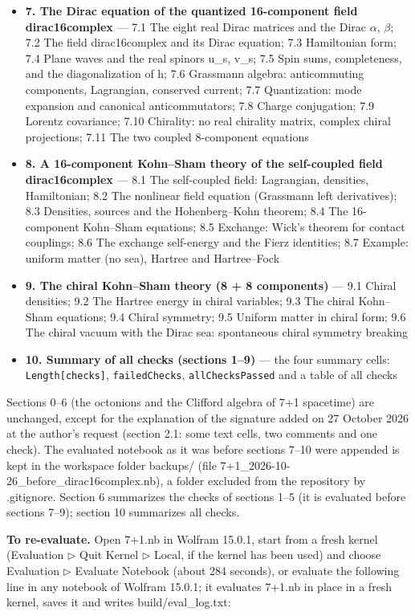 \documentclass[10pt,a4paper]{article}
\begin{document}
\begin{itemize}
\item \textbf{7. The Dirac equation of the quantized 16-component field dirac16complex} — 7.1 The eight real Dirac matrices and the Dirac \texorpdfstring{\ensuremath{\alpha}}{α}, \texorpdfstring{\ensuremath{\beta}}{β}; 7.2 The field dirac16complex and its Dirac equation; 7.3 Hamiltonian form; 7.4 Plane waves and the real spinors u\_s, v\_s; 7.5 Spin sums, completeness, and the diagonalization of h; 7.6 Grassmann algebra: anticommuting components, Lagrangian, conserved current; 7.7 Quantization: mode expansion and canonical anticommutators; 7.8 Charge conjugation; 7.9 Lorentz covariance; 7.10 Chirality: no real chirality matrix, complex chiral projections; 7.11 The two coupled 8-component equations
\item \textbf{8. A 16-component Kohn–Sham theory of the self-coupled field dirac16complex} — 8.1 The self-coupled field: Lagrangian, densities, Hamiltonian; 8.2 The nonlinear field equation (Grassmann left derivatives); 8.3 Densities, sources and the Hohenberg–Kohn theorem; 8.4 The 16-component Kohn–Sham equations; 8.5 Exchange: Wick’s theorem for contact couplings; 8.6 The exchange self-energy and the Fierz identities; 8.7 Example: uniform matter (no sea), Hartree and Hartree–Fock
\item \textbf{9. The chiral Kohn–Sham theory (8 + 8 components)} — 9.1 Chiral densities; 9.2 The Hartree energy in chiral variables; 9.3 The chiral Kohn–Sham equations; 9.4 Chiral symmetry; 9.5 Uniform matter in chiral form; 9.6 The chiral vacuum with the Dirac sea: spontaneous chiral symmetry breaking
\item \textbf{10. Summary of all checks (sections 1–9)} — the four summary cells: \texttt{Length[checks]}, \texttt{failedChecks}, \texttt{allChecksPassed} and a table of all checks
\end{itemize}
Sections 0–6 (the octonions and the Clifford algebra of 7+1 spacetime) are unchanged, except for the explanation of the signature added on 27 October 2026 at the author’s request (section 2.1: some text cells, two comments and one check). The evaluated notebook as it was before sections 7–10 were appended is kept in the workspace folder backups/ (file 7+1\_2026-10-26\_before\_dirac16complex.nb), a folder excluded from the repository by .gitignore. Section 6 summarizes the checks of sections 1–5 (it is evaluated before sections 7–9); section 10 summarizes all checks.

\textbf{To re-evaluate.} Open 7+1.nb in Wolfram 15.0.1, start from a fresh kernel (Evaluation \texorpdfstring{\ensuremath{\triangleright}}{▸} Quit Kernel \texorpdfstring{\ensuremath{\triangleright}}{▸} Local, if the kernel has been used) and choose Evaluation \texorpdfstring{\ensuremath{\triangleright}}{▸} Evaluate Notebook (about 284 seconds), or evaluate the following line in any notebook of Wolfram 15.0.1; it evaluates 7+1.nb in place in a fresh kernel, saves it and writes build/eval\_log.txt:
\end{document}
